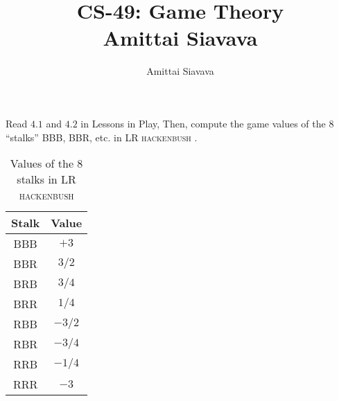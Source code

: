 \documentclass[11pt, reqno]{amsart}
\begin{document}

\title{CS-49: Game Theory\\ Amittai Siavava \\ }
\author{Amittai Siavava}


\setlength{\headheight}{13.0pt}
\setlength{\footskip}{15.0pt}

\maketitle

\bigskip

\def \cram { \textsc{cram} }
\def \dom { \textsc{domineering} }
\def \sub { \textsc{subtraction} }
\def \weighted { \textsc{weighted odds and evens}}
\def \nim { \textsc{nim} }
\def \P { \mathbf{P}}
\def \N { \mathbf{N}}
\def \cc { \mathbf{cc} }
\def \hackenbush { \textsc{LR hackenbush} }

\newpage
\begin{problem}[16]
  Read $4.1$ and $4.2$ in Lessons in Play,
  Then, compute the game values of the $8$ ``stalks'' BBB, BBR, etc.
  in \hackenbush.
  \begin{table}[h]
    \begin{tabular}{c | c }
      \bottomrule
      Stalk & Value \\
      \midrule
      BBB & $+3$\\
      BBR & $3/2$\\
      BRB & $3/4$\\
      BRR & $1/4$\\
      RBB & $-3/2$\\
      RBR & $-3/4$\\
      RRB & $-1/4$\\
      RRR & $-3$\\
      \toprule
    \end{tabular}
    \caption{Values of the $8$ stalks in \hackenbush}
  \end{table}
\end{problem}
\end{document}
